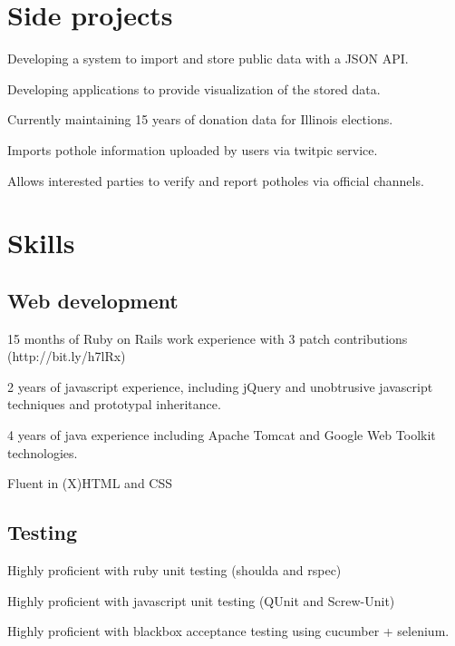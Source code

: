 \documentclass{resume}
\begin{document}
\section{Side projects}
\begin{compactitem}
  \item Developing a system to import and store public data with a JSON API.
  \item Developing applications to provide visualization of the stored data.
  \item Currently maintaining 15 years of donation data for Illinois elections.
\end{compactitem}

\begin{compactitem}
  \item Imports pothole information uploaded by users via twitpic service.
  \item Allows interested parties to verify and report potholes via official channels.
\end{compactitem}

\section{Skills}

\subsection{Web development}

\begin{compactitem}
  \item 15 months of Ruby on Rails work experience with 3 patch contributions (http://bit.ly/h7lRx)
  \item 2 years of javascript experience, including jQuery and unobtrusive javascript techniques and prototypal inheritance.
  \item 4 years of java experience including Apache Tomcat and Google Web Toolkit technologies.
  \item Fluent in (X)HTML and CSS
\end{compactitem}

\subsection{Testing}
\begin{compactitem}
  \item Highly proficient with ruby unit testing (shoulda and rspec)
  \item Highly proficient with javascript unit testing (QUnit and Screw-Unit)
  \item Highly proficient with blackbox acceptance testing using cucumber + selenium.
\end{compactitem}
\end{document}
